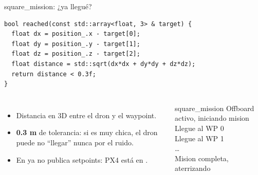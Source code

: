 \begin{frame}[fragile]{square\_mission: ¿ya llegué?}
  \begin{lstlisting}[style=cpp,caption={square\_mission.cpp}]
bool reached(const std::array<float, 3> & target) {
  float dx = position_.x - target[0];
  float dy = position_.y - target[1];
  float dz = position_.z - target[2];
  float distance = std::sqrt(dx*dx + dy*dy + dz*dz);
  return distance < 0.3f;
}
  \end{lstlisting}
  \begin{columns}[c]
    \small
    \begin{itemize}
      \item Distancia en 3D entre el dron y el waypoint.
      \item \textbf{0.3 m} de tolerancia: si es muy chica, el dron puede no ``llegar'' nunca por el ruido.
      \item En  ya no publica setpoints: PX4 está en .
    \end{itemize}
    \begin{terminal}{square\_mission}
Offboard activo, iniciando mision\\
Llegue al WP 0\\
Llegue al WP 1\\
\ldots\\
Mision completa, aterrizando
    \end{terminal}
  \end{columns}
\end{frame}

